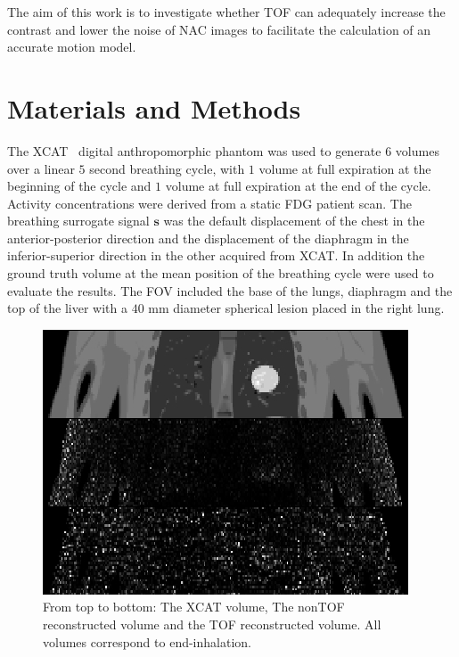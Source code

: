 \documentclass[journal]{IEEEtran}
\begin{document}
The aim of this work is to investigate whether TOF can adequately increase the contrast and lower the noise of NAC images to facilitate the calculation of an accurate motion model.

\section{Materials and Methods}
The XCAT~\cite{Segars2010} digital anthropomorphic phantom was used to generate $6$ volumes over a linear $5$ second breathing cycle, with $1$ volume at full expiration at the beginning of the cycle and $1$ volume at full expiration at the end of the cycle. Activity concentrations were derived from a static FDG patient scan. The breathing surrogate signal $\bm{s}$ was the default displacement of the chest in the anterior-posterior direction and the displacement of the diaphragm in the inferior-superior direction in the other acquired from XCAT. In addition the ground truth volume at the mean position of the breathing cycle were used to evaluate the results. The FOV included the base of the lungs, diaphragm and the top of the liver with a $40$ mm diameter spherical lesion placed in the right lung.

\begin{figure}[H]
    \centering
    \includegraphics[scale=0.35]{figures/reconstructed.png}
    \caption{From top to bottom: The XCAT volume, The nonTOF reconstructed volume and the TOF reconstructed volume. All volumes correspond to end-inhalation.}
    \label{fig:reconstructed}
\end{figure}
\end{document}
